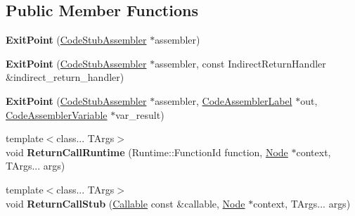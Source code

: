 \subsection*{Public Member Functions}
\begin{DoxyCompactItemize}
\item 
\mbox{\label{classv8_1_1internal_1_1ExitPoint_a6196665cbcc38c25cd1ebd80793a24da}} 
{\bfseries Exit\+Point} (\mbox{\hyperlink{classv8_1_1internal_1_1CodeStubAssembler}{Code\+Stub\+Assembler}} $\ast$assembler)
\item 
\mbox{\label{classv8_1_1internal_1_1ExitPoint_ade8da7ad2e1d4e65186eb866d5cd3576}} 
{\bfseries Exit\+Point} (\mbox{\hyperlink{classv8_1_1internal_1_1CodeStubAssembler}{Code\+Stub\+Assembler}} $\ast$assembler, const Indirect\+Return\+Handler \&indirect\+\_\+return\+\_\+handler)
\item 
\mbox{\label{classv8_1_1internal_1_1ExitPoint_af0e227b1af8ae02ef374a07ac7fac04c}} 
{\bfseries Exit\+Point} (\mbox{\hyperlink{classv8_1_1internal_1_1CodeStubAssembler}{Code\+Stub\+Assembler}} $\ast$assembler, \mbox{\hyperlink{classv8_1_1internal_1_1compiler_1_1CodeAssemblerLabel}{Code\+Assembler\+Label}} $\ast$out, \mbox{\hyperlink{classv8_1_1internal_1_1compiler_1_1CodeAssemblerVariable}{Code\+Assembler\+Variable}} $\ast$var\+\_\+result)
\item 
\mbox{\label{classv8_1_1internal_1_1ExitPoint_afe3517dd4ad919834ba075d50b56d07b}} 
{\footnotesize template$<$class... T\+Args$>$ }\\void {\bfseries Return\+Call\+Runtime} (Runtime\+::\+Function\+Id function, \mbox{\hyperlink{classv8_1_1internal_1_1compiler_1_1Node}{Node}} $\ast$context, T\+Args... args)
\item 
\mbox{\label{classv8_1_1internal_1_1ExitPoint_a2e0fe1df3209eae714cee92cc672d85e}} 
{\footnotesize template$<$class... T\+Args$>$ }\\void {\bfseries Return\+Call\+Stub} (\mbox{\hyperlink{classv8_1_1internal_1_1Callable}{Callable}} const \&callable, \mbox{\hyperlink{classv8_1_1internal_1_1compiler_1_1Node}{Node}} $\ast$context, T\+Args... args)
\item 

\end{DoxyCompactItemize}

